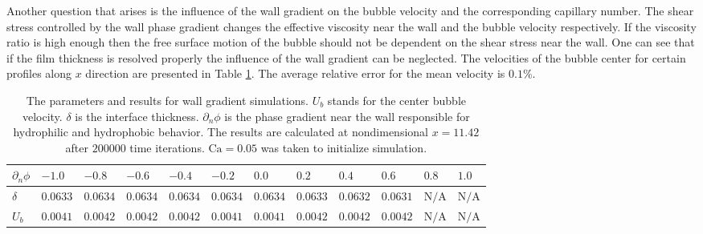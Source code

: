 \documentclass[preprint,12pt]{elsarticle}
\newcommand{\Ca}{\mathrm{Ca}}
\begin{document}
Another question that arises is the influence of the wall gradient on the bubble velocity and the
corresponding capillary number. The shear stress controlled by the wall phase gradient changes the
effective viscosity near the wall and the bubble velocity respectively. If the viscosity ratio is
high enough then the free surface motion of the bubble should not be dependent on the shear stress
near the wall.
One can see that if the film thickness is resolved properly the influence of the wall gradient can
be neglected. The velocities of the bubble center for certain profiles along $x$ direction are
presented in Table
\ref{table:parameters:wall:gradient}. 
The average relative error for the mean velocity is $0.1\%$.
\begin{table}
\begin{tabularx}{\textwidth}{|X|X X X X X X X X X X X|}
\hline
$\scriptstyle \partial_n \phi$& $\scriptstyle -1.0$& $\scriptstyle -0.8$&
$\scriptstyle -0.6$&$\scriptstyle -0.4$&$\scriptstyle -0.2$&$\scriptstyle
0.0$&$\scriptstyle 0.2$&$\scriptstyle 0.4$&$\scriptstyle 0.6$&$\scriptstyle 0.8$&$\scriptstyle
1.0$\\
\hline
$\scriptstyle \delta$& $\scriptstyle 0.0633$& $\scriptstyle 0.0634$& $\scriptstyle 0.0634$&
$\scriptstyle 0.0634$& $\scriptstyle 0.0634$& $\scriptstyle 0.0634$& $\scriptstyle 0.0633$&
$\scriptstyle 0.0632$& $\scriptstyle 0.0631$ &$\scriptstyle \mathrm{N/A}$&$\scriptstyle
\mathrm{N/A}$\\
\hline
$\scriptstyle U_{b}$ &$\scriptstyle 0.0041$& $\scriptstyle 0.0042$& $\scriptstyle 0.0042$
&$\scriptstyle 0.0042$ & $\scriptstyle 0.0041$& $\scriptstyle 0.0041$ & $\scriptstyle 0.0042$ &
$\scriptstyle 0.0042$ & $\scriptstyle 0.0042$ & $\scriptstyle \mathrm{N/A}$ &$\scriptstyle
\mathrm{N/A}$\\
\hline
\end{tabularx}
\caption{The parameters and results for wall gradient simulations. $U_{b}$ stands for the
center bubble velocity. $\delta$ is the interface thickness. $\partial_n \phi$ is the phase
gradient near the wall responsible for hydrophilic and hydrophobic behavior. The results are
calculated at nondimensional $x=11.42$ after $200 000$ time iterations. $\Ca=0.05$ was taken to
initialize simulation.
\label{table:parameters:wall:gradient}}
\end{table}
\end{document}

